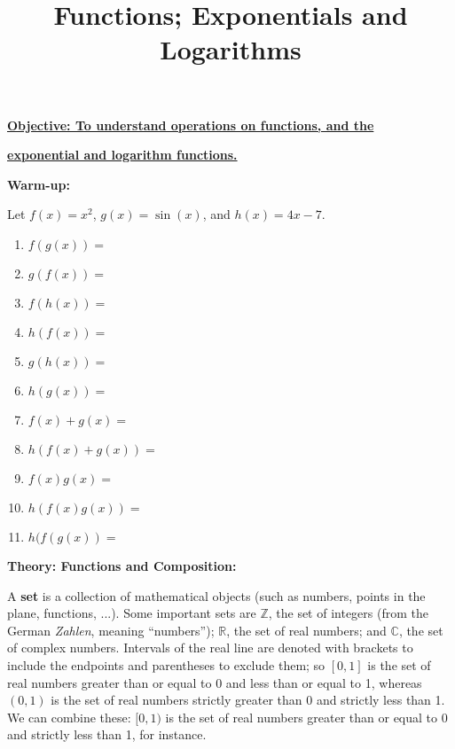\documentclass{article}
\begin{document}
\title{Functions; Exponentials and Logarithms}
\date{}

\maketitle
\thispagestyle{empty}

\Large

\textbf{\underline{Objective: To understand operations on functions, and the}}

\textbf{\underline{exponential and logarithm functions.}}





\vspace{5mm}


\textbf{Warm-up:}

\vspace{5mm}

Let $f(x)=x^2$, $g(x)=\sin(x)$, and $h(x)=4x-7$.

\begin{enumerate}
	\item $f(g(x))=$
	\item $g(f(x))=$
	\item $f(h(x))=$
	\item $h(f(x))=$
	\item $g(h(x))=$
	\item $h(g(x))=$
	\item $f(x)+g(x)=$
	\item $h(f(x)+g(x))=$
	\item $f(x)g(x)=$
	\item $h(f(x)g(x))=$
	\item $h(f(g(x))=$
\end{enumerate}


\clearpage




\textbf{Theory: Functions and Composition:}

\vspace{5mm}


A \textbf{set} is a collection of mathematical objects (such as numbers, points in the plane, functions, ...). Some important sets are $\mathbb{Z}$, the set of integers (from the German \textit{Zahlen}, meaning ``numbers''); $\mathbb{R}$, the set of real numbers; and $\mathbb{C}$, the set of complex numbers. Intervals of the real line are denoted with brackets to include the endpoints and parentheses to exclude them; so $[0,1]$ is the set of real numbers greater than or equal to 0 and less than or equal to 1, whereas $(0,1)$ is the set of real numbers strictly greater than 0 and strictly less than 1. We can combine these: $[0,1)$ is the set of real numbers greater than or equal to 0 and strictly less than 1, for instance.
\end{document}
